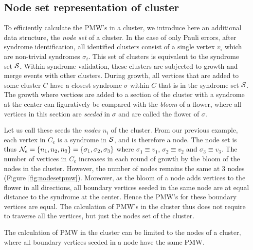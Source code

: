 \subsection{Node set representation of cluster}\label{sec:nodeset}

To efficiently calculate the PMW's in a cluster, we introduce here an additional data structure, the \emph{node set} of a cluster. In the case of only Pauli errors, after syndrome identification, all identified clusters consist of a single vertex $v_i$ which are non-trivial syndromes $\sigma_i$. This set of clusters is equivalent to the syndrome set $\mathcal{S}$. Within syndrome validation, these clusters are subjected to growth and merge events with other clusters. During growth, all vertices that are added to some cluster $C$ have a closest syndrome $\sigma$ within $C$ that is in the syndrome set $\mathcal{S}$. The growth where vertices are added to a section of the cluster with a syndrome at the center can figuratively be compared with the \emph{bloom} of a flower, where all vertices in this section are \emph{seeded} in $\sigma$ and are called the flower of $\sigma$. 

Let us call these seeds the \emph{nodes} $n_i$ of the cluster. From our previous example, each vertex in $C_e$ is a syndrome in $\mathcal{S}$, and is therefore a node. The node set is thus $\mathcal{N}_e = \{n_1, n_2, n_3\} = \{\sigma_1, \sigma_2, \sigma_3\}$ where $\sigma_1 \equiv v_1$, $\sigma_2 \equiv v_2$ and $\sigma_3 \equiv v_3$. The number of vertices in $C_e$ increases in each round of growth by the bloom of the nodes in the cluster. However, the number of nodes remains the same at 3 nodes (Figure \ref{fig:nodesetpmw}). Moreover, as the bloom of a node adds vertices to the flower in all directions, all boundary vertices seeded in the same node are at equal distance to the syndrome at the center. Hence the PMW's for these boundary vertices are equal. The calculation of PMW's in the cluster thus does not require to traverse all the vertices, but just the nodes set of the cluster.

\begin{lemma}
  The calculation of PMW in the cluster can be limited to the nodes of a cluster, where all boundary vertices seeded in a node have the same PMW.
\end{lemma}

